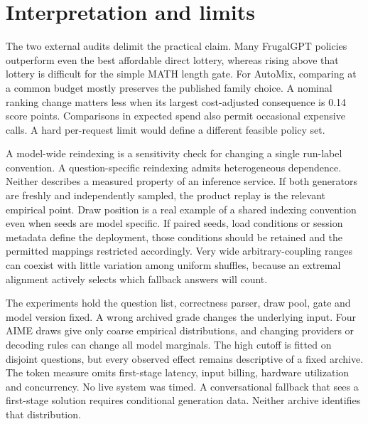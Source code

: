 \documentclass[11pt]{article}
\begin{document}

\section{Interpretation and limits}
The two external audits delimit the practical claim. Many FrugalGPT policies outperform even the best affordable direct lottery, whereas rising above that lottery is difficult for the simple MATH length gate. For AutoMix, comparing at a common budget mostly preserves the published family choice. A nominal ranking change matters less when its largest cost-adjusted consequence is 0.14 score points. Comparisons in expected spend also permit occasional expensive calls. A hard per-request limit would define a different feasible policy set.

A model-wide reindexing is a sensitivity check for changing a single run-label convention. A question-specific reindexing admits heterogeneous dependence. Neither describes a measured property of an inference service. If both generators are freshly and independently sampled, the product replay is the relevant empirical point. Draw position is a real example of a shared indexing convention even when seeds are model specific. If paired seeds, load conditions or session metadata define the deployment, those conditions should be retained and the permitted mappings restricted accordingly. Very wide arbitrary-coupling ranges can coexist with little variation among uniform shuffles, because an extremal alignment actively selects which fallback answers will count.

The experiments hold the question list, correctness parser, draw pool, gate and model version fixed. A wrong archived grade changes the underlying input. Four AIME draws give only coarse empirical distributions, and changing providers or decoding rules can change all model marginals. The high cutoff is fitted on disjoint questions, but every observed effect remains descriptive of a fixed archive. The token measure omits first-stage latency, input billing, hardware utilization and concurrency. No live system was timed. A conversational fallback that sees a first-stage solution requires conditional generation data. Neither archive identifies that distribution.
\end{document}
